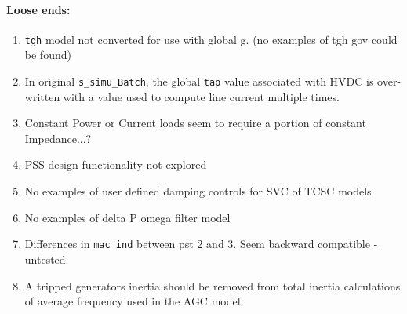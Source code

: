 \documentclass[12pt]{article}
\begin{document}
\begin{multicols}{2}
\paragraph{Loose ends:} %
	\begin{enumerate}
		\item \verb|tgh| model not converted for use with global g. (no examples of tgh gov could be found)
		\item In original \verb|s_simu_Batch|, the global \verb|tap| value associated with HVDC is over-written with  a value used to compute line current multiple times.
		\item Constant Power or Current loads seem to require a portion of constant Impedance...?
		\item PSS design functionality not explored
		\item No examples of user defined damping controls for SVC of TCSC models
		\item No examples of delta P omega filter model
		\item Differences in \verb|mac_ind| between pst 2 and 3. Seem backward compatible - untested.
		\item A tripped generators inertia should be removed from total inertia calculations of average frequency used in the AGC model.
	\end{enumerate}
\vfill\null
\columnbreak


\vfill\null
\end{multicols}
\end{document}
